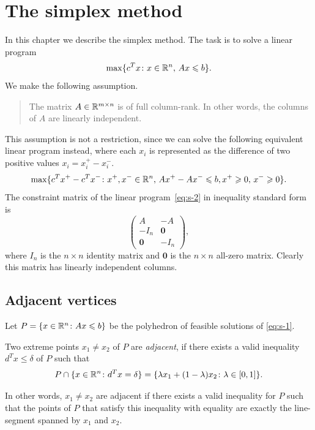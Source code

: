 \chapter{The simplex method}
\label{cha:simplex-method}


In this chapter we describe the simplex method. The task is to solve a linear program 
\begin{equation}
  \label{eq:s-1}
  \max\{c^Tx \colon x \in \mathbb{R}^n, \,  Ax \leqslant b\}.
\end{equation}
We make the following assumption.
\begin{quote}
  The matrix $A \in\mathbb{R}^{m\times n}$ is of full column-rank. In other words, the columns of $A$ are linearly independent. 
\end{quote}
%
This assumption is not a restriction, since we can solve  the following equivalent linear program instead, where each $x_i$ is represented as the difference of two positive values $x_i = x_i^+ - x_i^-$. 
\begin{equation}
  \label{eq:s-2}
    \max\{c^Tx^+-c^Tx^- \colon x^+ ,x^- \in \mathbb{R}^n, \,  Ax^+-Ax^- \leqslant b, x^+ \geqslant 0, \, x^- \geqslant 0\}.
\end{equation}
The constraint matrix of the linear program~\eqref{eq:s-2} in inequality standard form is 
\begin{displaymath}
  \begin{pmatrix}
    A & -A \\
    -I_n & \mathbf{0} \\
    \mathbf{0} & -I_n
  \end{pmatrix},
\end{displaymath}
where $I_n$ is the $n\times n$ identity matrix and $\mathbf{0}$ is the $n\times n$ all-zero matrix. Clearly this matrix has linearly independent columns. 


\section{Adjacent vertices}
\label{sec:adjacent-vertices}


Let $P = \{x \in \mathbb{R}^n \colon Ax \leqslant b\}$ be the polyhedron of feasible solutions of \eqref{eq:s-1}. 

\begin{definition}
  \label{def:s-1}
  Two extreme points $x_1\neq x_2$ of $P$ are \emph{adjacent}, if there exists a valid inequality $d^Tx \leq \delta$ of $P$ such that 
  \begin{displaymath}
    P \cap \{x \in \mathbb{R}^n \colon d^Tx = \delta\} = \{ \lambda x_1 + (1-\lambda)x_2 \colon \lambda \in [0,1]\}. 
  \end{displaymath}
\end{definition}
In other words, $x_1 \neq x_2$ are adjacent if there exists a valid inequality for $P$ such that the points of $P$ that satisfy this inequality with equality are exactly the line-segment spanned by $x_1$ and $x_2$. 

